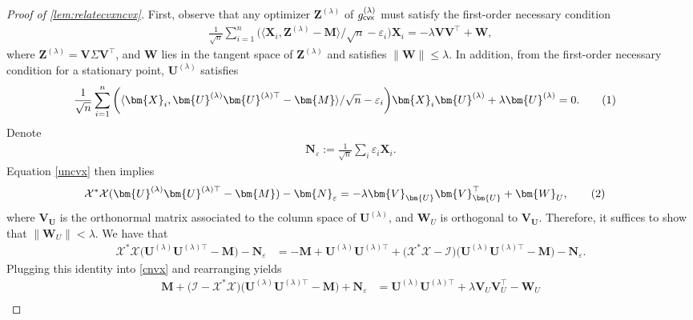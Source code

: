 \documentclass[10pt]{article}
\newcommand\numberthis{\addtocounter{equation}{1}\tag{\theequation}}
\newcommand{\eps}{\ensuremath{\varepsilon}}
\newcommand{\s}{^*}
\renewcommand{\t}{^{\top}}
\theoremstyle{definition}
\begin{document}
\begin{proof}[Proof of \cref{lem:relatecvxncvx}]
    First, observe that any  optimizer $\bm{Z}^{(\lambda)}$ of $g^{(\lambda)}_{{\sf cvx}}$ must satisfy the first-order necessary condition
\begin{align}
  \frac{1}{\sqrt{n}} \sum_{i=1}^{n} \bigg( \langle \bm{X}_i, \bm{Z}^{(\lambda)} - \bm{M} \rangle /\sqrt{n} - \eps_i \bigg) \bm{X}_i = -\lambda \bm{VV}\t + \bm{W},
\end{align}
where $\bm{Z}^{(\lambda)} = \bm{V} \Sigma \bm{V}\t$, and $\bm{W}$ lies in the tangent space of $\bm{Z}^{(\lambda)}$ and satisfies $\|\bm{W} \| \leq \lambda $.  In addition, from the first-order necessary condition for a stationary point, $\bm{U}^{(\lambda)}$ satisfies
\begin{align}
   \frac{1}{\sqrt{n}} \sum_{i=1}^{n} \bigg( \langle \bm{X}_i, \bm{U}^{(\lambda)}\bm{U}^{(\lambda)\top} - \bm{M} \rangle/\sqrt{n} - \eps_i \bigg) \bm{X}_i \bm{U}^{(\lambda)} + \lambda \bm{U}^{(\lambda)} &= 0. \numberthis \label{uncvx}
\end{align}
Denote
\begin{align}
    \bm{N}_{\eps} := \frac{1}{\sqrt{n}}\sum_i \eps_i \bm{X}_i.
\end{align}
Equation \cref{uncvx} then implies 
\begin{align}
\mathcal{X}\s \mathcal{X}( \bm{U}^{(\lambda)} \bm{U}^{(\lambda)\top} - \bm{M} ) - \bm{N}_{\eps} &= 
    -\lambda \bm{V}_{\bm{U}} \bm{V}_{\bm{U}}\t + \bm{W}_{U}, \numberthis \label{cnvx}
\end{align}
where $\bm{V}_{{\bm{U}}}$ is the orthonormal matrix associated to the column space of $\bm{U}^{{(\lambda)}}$, and $\bm{W}_U$ is orthogonal to $\bm{V}_{{\bm{U}}}$.  Therefore, it suffices to show that $\|\bm{W}_U \| < \lambda$.  
We have that 
\begin{align}
\mathcal{X}\s \mathcal{X} \big( \bm{U}^{(\lambda)} \bm{U}^{(\lambda)\top} - \bm{M} \big) - \bm{N}_{\eps} &= 
 -\bm{M} + \bm{U}^{(\lambda)}\bm{U}^{(\lambda)\top} + \bigg( \mathcal{X}\s \mathcal{X} - \mathcal{I} \bigg) \big( \bm{U}^{(\lambda)}\bm{U}^{(\lambda)\top} - \bm{M}  \big) - \bm{N}_{\eps}.
\end{align}
Plugging this identity into \eqref{cnvx} and rearranging yields
\begin{align}
    \bm{M} + \bigg( \mathcal{I} - \mathcal{X}\s \mathcal{X}  \bigg) \big( \bm{U}^{(\lambda)}\bm{U}^{(\lambda)\top} - \bm{M}  \big) + \bm{N}_{\eps} &=  \bm{U}^{(\lambda)}\bm{U}^{(\lambda)\top} + \lambda \bm{V}_{U} \bm{V}_U\t - \bm{W}_U \\

\end{align}
\end{proof}
\end{document}
